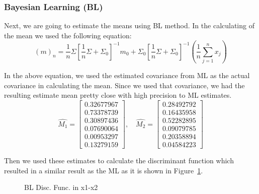 \documentclass[11pt, oneside]{article}   	%
\begin{document}
\subsubsection*{Bayesian Learning (BL)}
Next, we are going to estimate the means using BL method. In the calculating of the mean we used the following equation:
$$\left(m\right)_n=\frac{1}{n}\Sigma\left[\frac{1}{n}\Sigma+\Sigma_0\right]^{-1}m_0+\Sigma_0\left[\frac{1}{n}\Sigma+\Sigma_0\right]^{-1}\left(\frac{1}{n}\sum_{j=1}^{n}x_j\right)$$

In the above equation, we used the estimated covariance from ML as the actual covariance in calculating the mean. Since we used that covariance, we had the resulting estimate mean pretty close with high precision to ML estimates.
$$\hat{M_1} = \begin{bmatrix}
0.32677967 \\ 0.73378739 \\ 0.30897436 \\ 0.07690064 \\ 0.00953297 \\ 0.13279159
\end{bmatrix},\quad \hat{M_2} = \begin{bmatrix}
0.28492792 \\ 0.16435958 \\ 0.52282895 \\ 0.09079785 \\ 0.20358894 \\ 0.04584223
\end{bmatrix}$$

Then we used these estimates to calculate the discriminant function which resulted in a similar result as the ML as it is shown in Figure~\ref{fig:bl-disc-func}.

\begin{figure}
\begin{center}
\end{center}
\caption{BL Disc. Func. in x1-x2}
\label{fig:bl-disc-func}
\end{figure}
\end{document}
